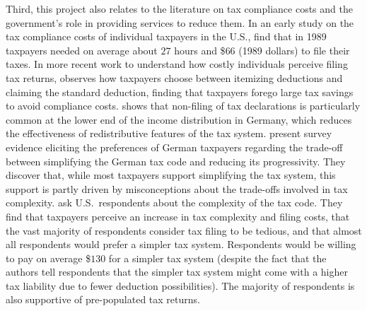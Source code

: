 \documentclass[12pt]{article}
\begin{document}
Third, this project also relates to the literature on tax compliance costs and the government's role in providing services to reduce them. In an early study on the tax compliance costs of individual taxpayers in the U.S., \textcite{blumenthal1992compliance} find that in 1989 taxpayers needed on average about $27$ hours and \$$66$ (1989 dollars) to file their taxes. In more recent work to understand how costly individuals perceive filing tax returns, \textcite{benzarti2020taxing} observes how taxpayers choose between itemizing deductions and claiming the standard deduction, finding that taxpayers forego large tax savings to avoid compliance costs. \textcite{hauck2024optional} shows that non-filing of tax declarations is particularly common at the lower end of the income distribution in Germany, which reduces the effectiveness of redistributive features of the tax system. \textcite{blesse2019people} present survey evidence eliciting the preferences of German taxpayers regarding the trade-off between simplifying the German tax code and reducing its progressivity. They discover that, while most taxpayers support simplifying the tax system, this support is partly driven by misconceptions about the trade-offs involved in tax complexity. \textcite{benzarti2024rising} ask U.S.\ respondents about the complexity of the tax code. They find that taxpayers perceive an increase in tax complexity and filing costs, that the vast majority of respondents consider tax filing to be tedious, and that almost all respondents would prefer a simpler tax system. Respondents would be willing to pay on average \$$130$ for a simpler tax system (despite the fact that the authors tell respondents that the simpler tax system might come with a higher tax liability due to fewer deduction possibilities). The majority of respondents is also supportive of pre-populated tax returns.



\printbibliography
\end{document}

